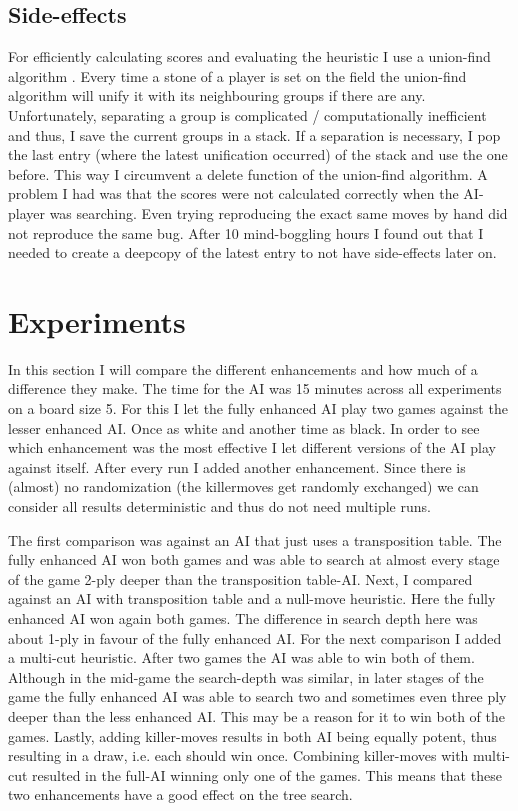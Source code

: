 \documentclass[a4paper]{article}
\begin{document}
\subsection{Side-effects}
For efficiently calculating scores and evaluating the heuristic I use a union-find algorithm \cite{galler1964improved}. Every time a stone of a player is set on the field the union-find algorithm will unify it with its neighbouring groups if there are any. Unfortunately, separating a group is complicated / computationally inefficient and thus, I save the current groups in a stack. If a separation is necessary, I pop the last entry (where the latest unification occurred) of the stack and use the one before. This way I circumvent a delete function of the union-find algorithm.
A problem I had was that the scores were not calculated correctly when the AI-player was searching. Even trying reproducing the exact same moves by hand did not reproduce the same bug. After 10 mind-boggling hours I found out that I needed to create a deepcopy of the latest entry to not have side-effects later on.

\section{Experiments}
In this section I will compare the different enhancements and how much of a difference they make. The time for the AI was 15 minutes across all experiments on a board size 5. For this I let the fully enhanced AI play two games against the lesser enhanced AI. Once as white and another time as black.
In order to see which enhancement was the most effective I let different versions of the AI play against itself. After every run I added another enhancement. Since there is (almost) no randomization (the killermoves get randomly exchanged) we can consider all results deterministic and thus do not need multiple runs.

The first comparison was against an AI that just uses a transposition table. The fully enhanced AI won both games and was able to search at almost every stage of the game 2-ply deeper than the transposition table-AI.
Next, I compared against an AI with transposition table and a null-move heuristic. Here the fully enhanced AI won again both games. The difference in search depth here was about 1-ply in favour of the fully enhanced AI.
For the next comparison I added a multi-cut heuristic. After two games the AI was able to win both of them. Although in the mid-game the search-depth was similar, in later stages of the game the fully enhanced AI was able to search two and sometimes even three ply deeper than the less enhanced AI. This may be a reason for it to win both of the games.
Lastly, adding killer-moves results in both AI being equally potent, thus resulting in a draw, i.e. each should win once.
Combining killer-moves with multi-cut resulted in the full-AI winning only one of the games. This means that these two enhancements have a good effect on the tree search.



\end{document}
